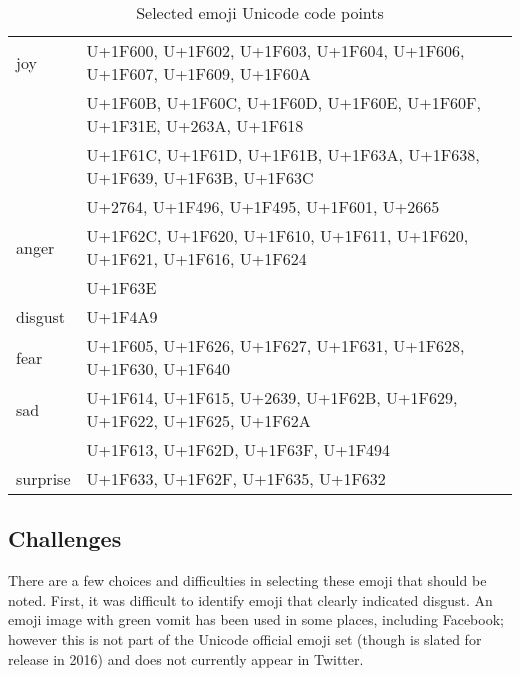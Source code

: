 \documentclass[10pt, a4paper]{article}
\begin{document}
\begin{table}
	\begin{tabular}{ll}
joy      & {\tiny U+1F600, U+1F602, U+1F603, U+1F604, U+1F606, U+1F607, U+1F609, U+1F60A} \\
         & {\tiny U+1F60B, U+1F60C, U+1F60D, U+1F60E, U+1F60F, U+1F31E, U+263A, U+1F618} \\
         & {\tiny U+1F61C, U+1F61D, U+1F61B, U+1F63A, U+1F638, U+1F639, U+1F63B, U+1F63C} \\
         & {\tiny U+2764,  U+1F496, U+1F495, U+1F601, U+2665} \\
anger    & {\tiny U+1F62C, U+1F620, U+1F610, U+1F611, U+1F620, U+1F621, U+1F616, U+1F624} \\
         & {\tiny U+1F63E} \\
disgust  & {\tiny U+1F4A9} \\
fear     & {\tiny U+1F605, U+1F626, U+1F627, U+1F631, U+1F628, U+1F630, U+1F640} \\
sad      & {\tiny U+1F614, U+1F615, U+2639, U+1F62B, U+1F629, U+1F622, U+1F625, U+1F62A} \\
         & {\tiny U+1F613, U+1F62D, U+1F63F, U+1F494} \\
surprise & {\tiny U+1F633, U+1F62F, U+1F635, U+1F632} \\
	\end{tabular}
	\caption{Selected emoji Unicode code points}
	\label{tab:selected-emoji-codpoints}
\end{table}

\subsection{Challenges}

There are a few choices and difficulties in selecting these emoji that should be noted.
First, it was difficult to identify emoji that clearly indicated disgust. 
An emoji image with green vomit has been used in some places, including Facebook; however this is not part of the Unicode official emoji set (though is slated for release in 2016) and does not currently appear in Twitter.
\end{document}
